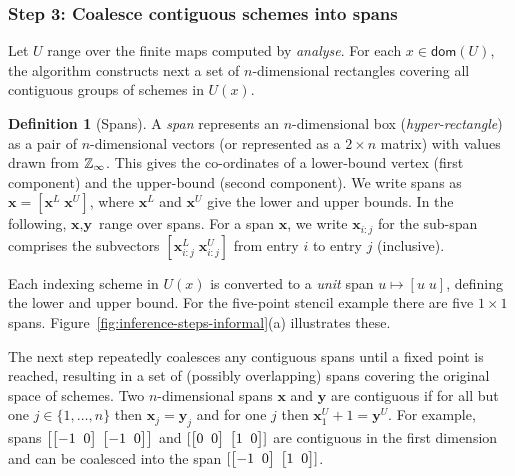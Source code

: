 \documentclass[9pt,preprint]{sigplanconf}
\newcounter{block}
\theoremstyle{definition}
\newtheorem{definition}[block]{Definition}
\newcommand{\vect}[1]{\textbf{#1}}
\newcommand{\vtwoh}[2]{\setlength{\arraycolsep}{0em}
\left[\begin{array}{cc}#1 \; & \; #2\end{array}\right]}
\begin{document}
\subsubsection{Step 3: Coalesce contiguous schemes into spans}
\label{sec:inf-step3}

Let $U$ range over the finite maps computed by \textit{analyse}.  For
each $x \in \mathsf{dom}(U)$, the algorithm 
constructs next a set of $n$-dimensional rectangles covering all contiguous groups of schemes
in $U(x)$. 

\newcommand{\spanOp}{\textsf{spans}}

\begin{definition}[Spans]
  A \emph{span} represents an $n$-dimensional box
  (\emph{hyper-rectangle}) as a pair of $n$-dimensional vectors (or
  represented as a $2 \times n$ matrix) with values drawn from
  $\mathbb{Z}_\infty{}$. This gives the co-ordinates of a lower-bound vertex
  (first component) and the upper-bound (second component). We write 
  spans as $\vect{x} = [\vect{x}^L \; \vect{x}^U]$, where $\vect{x}^L$
  and $\vect{x}^U$ give the lower and upper bounds.  In
  the following, $\vect{x}, \vect{y}$ range over spans.  For a span
  $\vect{x}$, we write $\vect{x}_{i:j}$ for the sub-span comprises the
  subvectors $[\vect{x}^L_{i:j} \; \vect{x}^U_{i:j}]$ from entry $i$
  to entry $j$ (inclusive).
\end{definition}

\noindent
Each indexing scheme in $U(x)$ is converted to a \emph{unit} span $u \mapsto [u \; 
u]$, defining the lower and upper bound.
 For the five-point stencil example there are five $1 \times 1$ spans.
Figure~\ref{fig:inference-steps-informal}(a) illustrates these.

The next step repeatedly coalesces any contiguous spans
until a fixed point is reached, resulting in a set of (possibly
overlapping) spans covering the original space of schemes. Two $n$-dimensional spans $\vect{x}$ and $\vect{y}$
are contiguous if for all but one $j \in \{1, \ldots, n\}$ then
$\vect{x}_j = \vect{y}_j$ and for one $j$ then $\vect{x}^U_1 + 1 =
\vect{y}^U$. For example, spans
$\left[\vtwoh{-1}{0}\; \vtwoh{-1}{0}\right]$ and $[\vtwoh{0}{0} \; \vtwoh{1}{0}]$ 
are contiguous in the first dimension and can be coalesced
into the span $[\vtwoh{-1}{0} \; \vtwoh{1}{0}]$.
\end{document}
